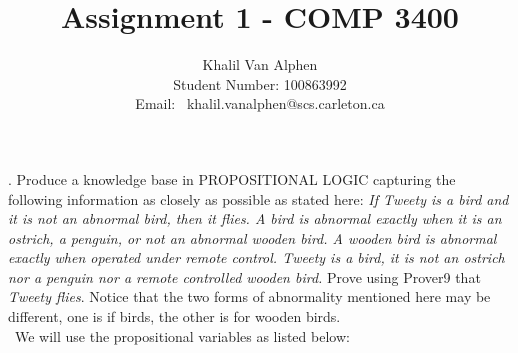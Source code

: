 \documentclass[fullpage]{article}
\title{\vspace*{-2cm}\bf Assignment 1 - COMP 3400}
\author{Khalil Van Alphen\\
Student Number: 100863992\\ Email: \  khalil.vanalphen@scs.carleton.ca}
\date{}
\begin{document}
\maketitle
\pagestyle{plain}
\thispagestyle{empty}

. Produce a knowledge base in PROPOSITIONAL LOGIC capturing
the following information as closely as possible as stated here: {\em If Tweety is a bird and it is not an abnormal bird, then it flies. A bird is abnormal exactly when it is an ostrich, a penguin, or not an abnormal wooden bird. A wooden bird is abnormal exactly when operated under remote control. Tweety is a bird, it is not an ostrich nor a penguin nor a remote controlled wooden bird.} Prove using Prover9 that {\em Tweety flies}. Notice that the two forms of abnormality mentioned here may be different, one is if birds, the other is for wooden birds.\\

 \ We will use the propositional variables as listed below:
\end{document}
